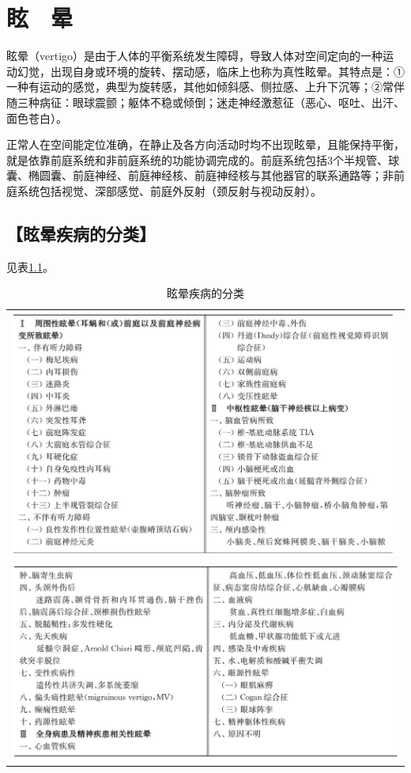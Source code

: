 \chapter{眩　晕}

眩晕（vertigo）是由于人体的平衡系统发生障碍，导致人体对空间定向的一种运动幻觉，出现自身或环境的旋转、摆动感，临床上也称为真性眩晕。其特点是：①一种有运动的感觉，典型为旋转感，其他如倾斜感、侧拉感、上升下沉等；②常伴随三种病征：眼球震颤；躯体不稳或倾倒；迷走神经激惹征（恶心、呕吐、出汗、面色苍白）。

正常人在空间能定位准确，在静止及各方向活动时均不出现眩晕，且能保持平衡，就是依靠前庭系统和非前庭系统的功能协调完成的。前庭系统包括3个半规管、球囊、椭圆囊、前庭神经、前庭神经核、前庭神经核与其他器官的联系通路等；非前庭系统包括视觉、深部感觉、前庭外反射（颈反射与视动反射）。

\section{【眩晕疾病的分类】}

见表\ref{tab47-1}。

\begin{longtable}{c}
 \caption{眩晕疾病的分类}
 \label{tab47-1}
 \endfirsthead
 \caption[]{眩晕疾病的分类}
 \endhead
 \includegraphics[width=\textwidth,height=\textheight,keepaspectratio]{./images/Image00295.jpg}\\
 \includegraphics[width=\textwidth,height=\textheight,keepaspectratio]{./images/Image00296.jpg}
 \end{longtable}

